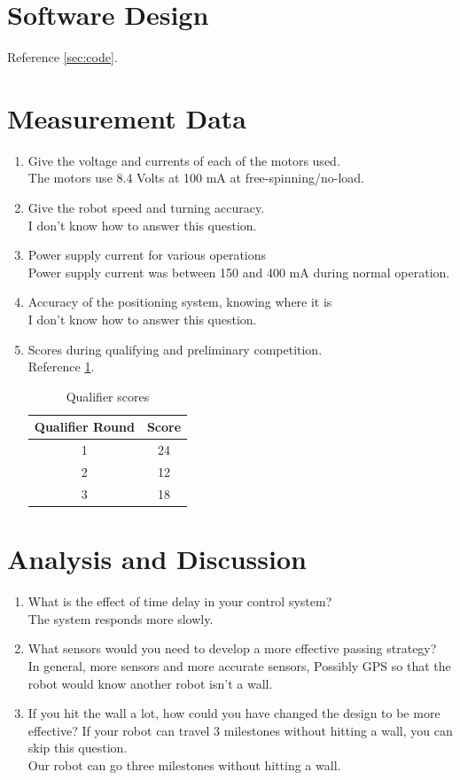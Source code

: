\documentclass[12pt]{article}
\newcommand{\probb}{}
\newcommand{\soll}{\vspace{0.5em}\\}
\begin{document}
\section{Software Design}
Reference \cref{sec:code}.

\section{Measurement Data}
\begin{enumerate}
\item \probb Give the voltage and currents of each of the motors used.
  \soll The motors use 8.4 Volts at 100 mA at free-spinning/no-load.
\item \probb Give the robot speed and turning accuracy. \soll I don't know how
  to answer this question.
\item \probb Power supply current for various operations \soll Power
  supply current was between 150 and 400 mA during normal operation.
\item \probb Accuracy of the positioning system, knowing where it is
  \soll I don't know how to answer this question.
\item \probb Scores during qualifying and preliminary competition.
  \soll Reference \cref{tab:qualifier}.
  \begin{table}
    \centering
    \begin{tabular}{c|c}
      Qualifier Round & Score \\ \hline
      1 & 24 \\
      2 & 12 \\
      3 & 18 \\
    \end{tabular}
    \caption{Qualifier scores}
    \label{tab:qualifier}
  \end{table}
\end{enumerate}

\section{Analysis and Discussion}

\begin{enumerate}[1)]
\item \probb What is the effect of time delay in your control system?
  \soll The system responds more slowly.
\item \probb What sensors would you need to develop a more effective
  passing strategy? \soll In general, more sensors and more accurate
  sensors, Possibly GPS so that the robot would know another robot
  isn't a wall.
\item \probb If you hit the wall a lot, how could you have changed the
  design to be more effective? If your robot can travel 3 milestones
  without hitting a wall, you can skip this question. \soll Our robot
  can go three milestones without hitting a wall.
\end{enumerate}
\end{document}
